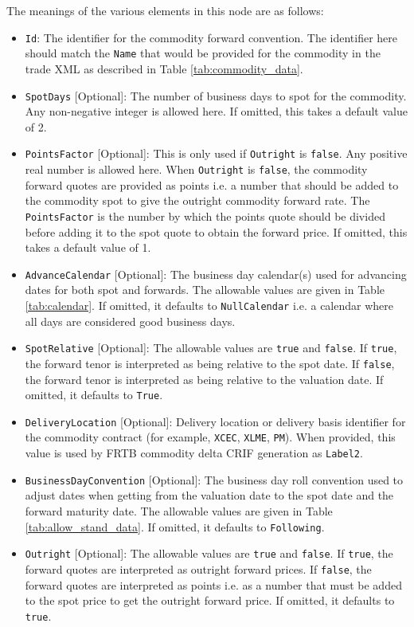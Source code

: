 The meanings of the various elements in this node are as follows:
\begin{itemize}
\item \lstinline!Id!: The identifier for the commodity forward convention. The identifier here should match the \lstinline!Name! that would be provided for the commodity in the trade XML as described in Table \ref{tab:commodity_data}.
\item \lstinline!SpotDays! [Optional]: The number of business days to spot for the commodity. Any non-negative integer is allowed here. If omitted, this takes a default value of 2.
\item \lstinline!PointsFactor! [Optional]: This is only used if \lstinline!Outright! is \lstinline!false!. Any positive real number is allowed here. When \lstinline!Outright! is \lstinline!false!, the commodity forward quotes are provided as points i.e. a number that should be added to the commodity spot to give the outright commodity forward rate. The \lstinline!PointsFactor! is the number by which the points quote should be divided before adding it to the spot quote to obtain the forward price. If omitted, this takes a default value of 1.
\item \lstinline!AdvanceCalendar! [Optional]: The business day calendar(s) used for advancing dates for both spot and forwards. The allowable values are given in Table \ref{tab:calendar}. If omitted, it defaults to \lstinline!NullCalendar! i.e. a calendar where all days are considered good business days.
\item \lstinline!SpotRelative! [Optional]: The allowable values are \lstinline!true! and \lstinline!false!. If \lstinline!true!, the forward tenor is interpreted as being relative to the spot date. If \lstinline!false!, the forward tenor is interpreted as being relative to the valuation date. If omitted, it defaults to \lstinline!True!.
\item \lstinline!DeliveryLocation! [Optional]: Delivery location or delivery basis identifier for the commodity contract (for example, \lstinline!XCEC!, \lstinline!XLME!, \lstinline!PM!). When provided, this value is used by FRTB commodity delta CRIF generation as \lstinline!Label2!.
\item \lstinline!BusinessDayConvention! [Optional]: The business day roll convention used to adjust dates when getting from the valuation date to the spot date and the forward maturity date. The allowable values are given in Table \ref{tab:allow_stand_data}. If omitted, it defaults to \lstinline!Following!.
\item \lstinline!Outright! [Optional]: The allowable values are \lstinline!true! and \lstinline!false!. If \lstinline!true!, the forward quotes are interpreted as outright forward prices. If \lstinline!false!, the forward quotes are interpreted as points i.e. as a number that must be added to the spot price to get the outright forward price. If omitted, it defaults to \lstinline!true!.
\end{itemize}

